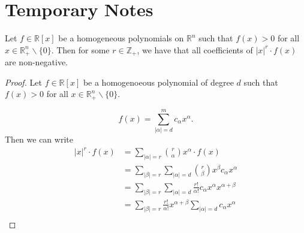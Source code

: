 \documentclass[./main.tex]{subfiles}
\begin{document}
\section{Temporary Notes}
\begin{thm}
Let $f \in \mathbb R [x]$ be a homogeneous polynomials on $\mathbb R^n $ such that $f(x) > 0 $ for all $ x \in  \mathbb R_+^n \backslash \lbrace 0 \rbrace$. Then for some $r \in \mathbb Z_+$, we have that all coefficients of $ \vert x \vert^r  \cdot f(x)$ are non-negative.
\begin{proof}
Let $f \in \mathbb{R}[x]$ be a homogenoeous polynomial of degree $d$ such that $f(x) > 0 $ for all $x \in \mathbb R _+^n \backslash \lbrace 0 \rbrace$.

\begin{equation}
 f(x)= \sum_{\vert \alpha \vert=d}^m c_\alpha x^{\alpha}. 
\end{equation}
Then we can write
\begin{align*}
\vert x \vert^r \cdot f (x) &= \sum_{\vert \alpha \vert = r } \binom r \alpha x^\alpha \cdot f(x) \\
&= \sum_{\vert \beta \vert = r } \sum_{\vert \alpha \vert=d}  \binom r \beta x^\beta   c_\alpha x^\alpha \\
&= \sum_{\vert \beta \vert = r } \sum_{\vert \alpha \vert=d} \frac{r!}{\alpha!} c_\alpha x^\alpha x^{\alpha+\beta} \\
&= \sum_{\vert \beta \vert = r }  \frac{r!}{\alpha!} x^{\alpha+\beta} \sum_{\vert \alpha \vert=d} c_\alpha x^\alpha  \\
\end{align*}
\end{proof}
\end{thm}
\begin{thm}


\end{thm}
\begin{thm}

\end{thm}
\begin{thm}

\end{thm}
\end{document}
